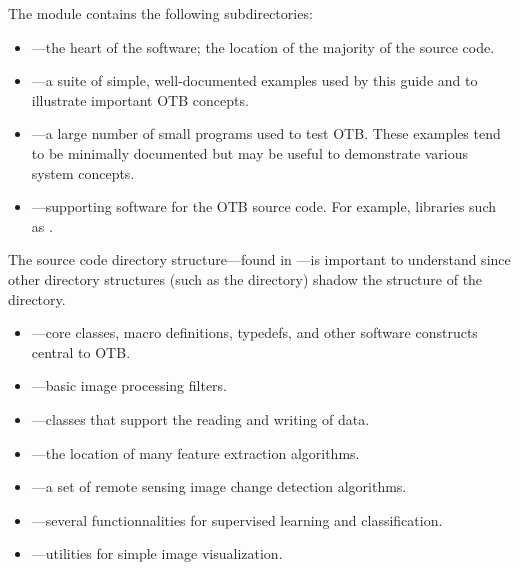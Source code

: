 The  module contains the following subdirectories:
\begin{itemize}
        \item {}---the heart of the software; the location
        of the majority of the source code.
        \item {}---a suite of simple, well-documented
        examples used by this guide and to illustrate important
        OTB concepts.
        \item {}---a large number of small programs used
        to test OTB. These examples tend to be minimally documented but may
        be useful to demonstrate various system concepts. 
        \item {}---supporting software for the OTB
        source code. For example, libraries such as .%
\end{itemize}

The source code directory structure---found in ---is 
important to understand since other directory structures (such as the
 directory) shadow the structure of the
 directory.
\begin{itemize}
        \item {}---core classes, macro definitions,
        typedefs, and other software constructs central to OTB.
        \item {}---basic image processing
        filters.
        \item {}---classes that support the reading
        and writing of data.
	\item {}---the location of many
	feature extraction algorithms.
	\item {}---a set of remote
	sensing image change detection algorithms.
	\item {}---several functionnalities for
	supervised learning and classification.
	\item {}---utilities for simple image visualization.
	  
\end{itemize}

